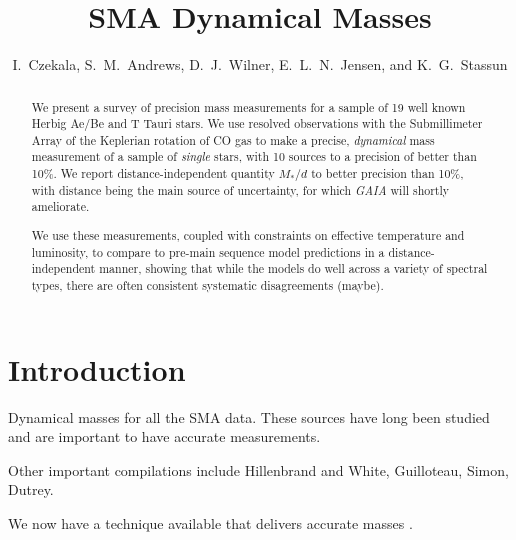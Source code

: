 \documentclass{aastex6}
\begin{document}
\title{SMA Dynamical Masses}
\author{I.~Czekala, S.~M.~Andrews, D.~J.~Wilner, E.~L.~N.~Jensen, and K.~G.~Stassun}

\begin{abstract}
We present a survey of precision mass measurements for a sample of 19 well known Herbig Ae/Be and T Tauri stars. We use resolved observations with the Submillimeter Array of the Keplerian rotation of CO gas to make a precise, \emph{dynamical} mass measurement of a sample of \emph{single} stars, with 10 sources to a precision of better than 10\%. We report distance-independent quantity $M_\ast/d$ to better precision than 10\%, with distance being the main source of uncertainty, for which \emph{GAIA} will shortly ameliorate.

We use these measurements, coupled with constraints on effective temperature and luminosity, to compare to pre-main sequence model predictions in a distance-independent manner, showing that while the models do well across a variety of spectral types, there are often consistent systematic disagreements (maybe).
\end{abstract}


\section{Introduction}

Dynamical masses for all the SMA data. These sources have long been studied and are important to have accurate measurements.

Other important compilations include Hillenbrand and White, Guilloteau, Simon, Dutrey.

We now have a technique available that delivers accurate masses \citep{rosenfeld12b, czekala15a, czekala16}.
\end{document}
